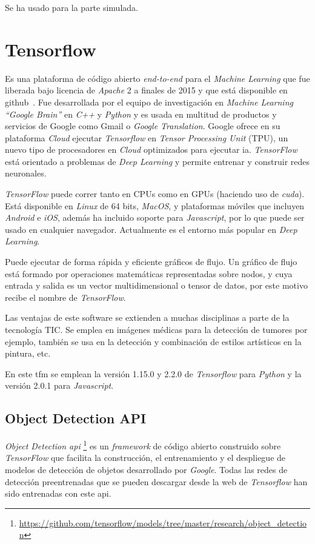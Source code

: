 Se ha usado para la parte simulada.

\section{Tensorflow}
Es una plataforma de código abierto \textit{end-to-end} para el \textit{Machine Learning} que fue liberada bajo licencia de \textit{Apache} 2 a finales de 2015 y que está disponible en github~\cite{github_tensorflow}. Fue desarrollada por el equipo de investigación en \textit{Machine Learning “Google Brain”}  en \textit{C++} y \textit{Python} y es usada en multitud de productos y servicios de Google como Gmail o \textit{Google Translation}. Google ofrece en su plataforma \textit{Cloud} ejecutar \textit{Tensorflow} en \textit{Tensor Processing Unit} (TPU), un nuevo tipo de procesadores en \textit{Cloud} optimizados para ejecutar \acrfull{ia}.  \textit{TensorFlow} está orientado a problemas de \textit{Deep Learning} y permite entrenar y construir redes neuronales. 

\textit{TensorFlow} puede correr tanto en CPUs como en GPUs (haciendo uso de \textit{\acrfull{cuda}}). Está disponible en \textit{Linux} de 64 bits, \textit{MacOS}, y plataformas móviles que incluyen \textit{Android} e \textit{iOS}, además ha incluido soporte para \textit{Javascript}, por lo que puede ser usado en cualquier navegador. Actualmente es el entorno más popular en \textit{Deep Learning}.

Puede ejecutar de forma rápida y eficiente gráficos de flujo. Un gráfico de flujo está formado por operaciones matemáticas representadas sobre nodos, y cuya entrada y salida es un vector multidimensional o tensor de datos, por este motivo recibe el nombre de \textit{TensorFlow}.

Las ventajas de este software se extienden a muchas disciplinas a parte de la tecnología TIC. Se emplea en imágenes médicas para la detección de tumores por ejemplo, también se usa en la detección y combinación de estilos artísticos en la pintura, etc.

En este \acrshort{tfm} se emplean la versión 1.15.0 y 2.2.0 de \textit{Tensorflow} para \textit{Python} y la versión 2.0.1 para \textit{Javascript}.
\subsection{Object Detection API}
\textit{Object Detection \acrshort{api}} \footnote{\url{https://github.com/tensorflow/models/tree/master/research/object_detection}} es un \textit{framework} de código abierto construido sobre \textit{TensorFlow} que facilita la construcción, el entrenamiento y el despliegue de modelos de detección de objetos desarrollado por \textit{Google}. Todas las redes de detección preentrenadas que se pueden descargar desde la web de \textit{Tensorflow} han sido entrenadas con este \acrshort{api}.

